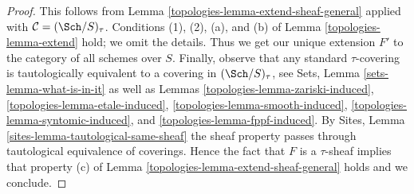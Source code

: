 \begin{proof}

This follows from Lemma \ref{topologies-lemma-extend-sheaf-general}
applied with $\mathcal{C} = (\Sch/S)_\tau$.
Conditions (1), (2), (a), and (b) of Lemma \ref{topologies-lemma-extend}
hold; we omit the details. Thus we get our unique extension $F'$
to the category of all schemes over $S$. Finally, observe that
any standard $\tau$-covering is tautologically equivalent to a
covering in $(\Sch/S)_\tau$, see Sets, Lemma \ref{sets-lemma-what-is-in-it}
as well as Lemmas \ref{topologies-lemma-zariski-induced},
\ref{topologies-lemma-etale-induced},
\ref{topologies-lemma-smooth-induced},
\ref{topologies-lemma-syntomic-induced}, and
\ref{topologies-lemma-fppf-induced}. By
Sites, Lemma \ref{sites-lemma-tautological-same-sheaf}
the sheaf property passes through tautological equivalence
of coverings. Hence the fact that $F$ is a $\tau$-sheaf implies
that property (c) of Lemma \ref{topologies-lemma-extend-sheaf-general} holds
and we conclude.
\end{proof}



